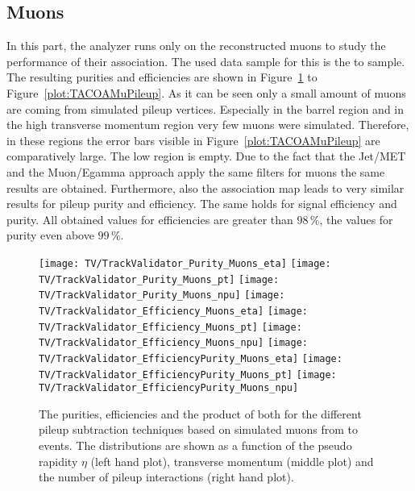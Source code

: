 

\subsection{Muons \label{sec:TASEFRDAM}}

In this part, the analyzer runs only on the reconstructed muons to study the performance of their association. The used data sample for this is the \Zz to \MM sample. The resulting purities and efficiencies are shown in Figure~\ref{plot:TACOAMuSignal} to Figure~\ref{plot:TACOAMuPileup}. As it can be seen only a small amount of muons are coming from simulated pileup vertices. Especially in the barrel region and in the high transverse momentum region very few muons were simulated. Therefore, in these regions the error bars visible in Figure~\ref{plot:TACOAMuPileup} are comparatively large. The low \pt region is empty. Due to the fact that the Jet/MET and the Muon/Egamma approach apply the same filters for muons the same results are obtained. Furthermore, also the association map leads to very similar results for pileup purity and efficiency. The same holds for signal efficiency and purity. All obtained values for efficiencies are greater than $98\,\%$, the values for purity even above $99\,\%$.

\begin{figure}[h!t]
  \centering
  \texttt{[image: TV/TrackValidator\_Purity\_Muons\_eta]}
  \texttt{[image: TV/TrackValidator\_Purity\_Muons\_pt]}
  \texttt{[image: TV/TrackValidator\_Purity\_Muons\_npu]}
  \newline
  \texttt{[image: TV/TrackValidator\_Efficiency\_Muons\_eta]}
  \texttt{[image: TV/TrackValidator\_Efficiency\_Muons\_pt]}
  \texttt{[image: TV/TrackValidator\_Efficiency\_Muons\_npu]}
  \newline
  \texttt{[image: TV/TrackValidator\_EfficiencyPurity\_Muons\_eta]}
  \texttt{[image: TV/TrackValidator\_EfficiencyPurity\_Muons\_pt]}
  \texttt{[image: TV/TrackValidator\_EfficiencyPurity\_Muons\_npu]}
  \caption[Purity, efficiency and their product for the different pileup subtraction techniques based on simulated muons from \Zz to \MM events]{The purities, efficiencies and the product of both for the different pileup subtraction techniques based on simulated muons from \Zz to \MM events. The distributions are shown as a function of the pseudo rapidity $\eta$ (left hand plot), transverse momentum (middle plot) and the number of pileup interactions (right hand plot). \label{plot:TACOAMuSignal}}
\end{figure}

